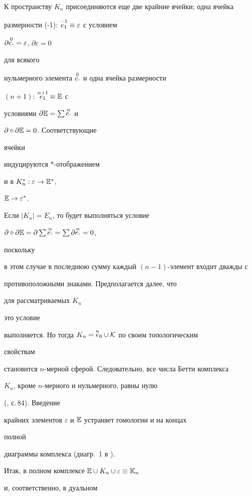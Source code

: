 К пространству $K_n$ присоединяются еще две крайние ячейки; одна ячейка 


размерности (-1): $\overset{-1}{e_1}{}\equiv\varepsilon$ с условием  


$\partial\overset{0}{e{}_{\textstyle\cdot}}{}=\varepsilon$, $\partial\varepsilon=0$


для всякого 


нульмерного элемента $\overset{0}{e{}_{\textstyle\cdot}}{}$ и одна ячейка размерности 


$(n+1)$: $\overset{n+1}{e_1}{}\equiv\Bbb E$ с 


условиями $\partial\Bbb E=\sum\overset{n}{e{}_{\textstyle\cdot}}{}$ и 


$\partial\circ\partial\Bbb E=0$. Соответствующие 


ячейки 


индуцируются $\ast$-отображением 


\cite{Yak1} и в $K^*_n:\varepsilon\to\Bbb E^*$, 


$\Bbb E\to\varepsilon^*$. 


Если $|K_n|=E_n$, то будет выполняться условие 


$\partial\circ\partial\Bbb E=\partial\sum\up{n}{e\scd} 


=\sum\partial\up{n}{e\scd}=0$,


поскольку 


в этом случае в последнюю сумму каждый $(n-1)$-элемент входит дважды с 


противоположными знаками. Предполагается далее, что


для рассматриваемых $K_n$


это условие 


выполняется. Но тогда $K_n=\overset{n}{e}{}_0\cup\cal K$ по своим топологическим 


свойствам 


становится $n$-мерной сферой. Следовательно, все числа Бетти комплекса 


$K_n$, кроме $n$-мерного и нульмерного, равны нулю 


(\cite{Sei}, с.\,84). Введение 


крайних элементов $\varepsilon$ и $\Bbb E$ устраняет гомологии и на концах 


полной 


диаграммы комплекса (диагр. \No\,1 в \cite{Yak1}). 


 


Итак, в полном комплексе $\Bbb E\cup K_n\cup\varepsilon\equiv\Bbb K_n$ 


и, соответственно, в дуальном 


